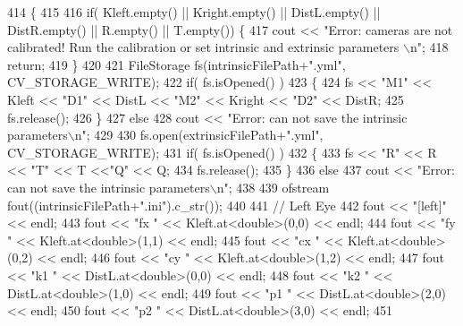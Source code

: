\begin{DoxyCode}
414                                                                                      \{
415 
416     \textcolor{keywordflow}{if}( Kleft.empty() || Kright.empty() || DistL.empty() || DistR.empty() || R.empty() || T.empty()) \{
417         cout << \textcolor{stringliteral}{"Error: cameras are not calibrated! Run the calibration or set intrinsic and extrinsic
       parameters \(\backslash\)n"};
418         \textcolor{keywordflow}{return};
419     \}
420 
421     FileStorage fs(intrinsicFilePath+\textcolor{stringliteral}{".yml"}, CV\_STORAGE\_WRITE);
422     \textcolor{keywordflow}{if}( fs.isOpened() )
423     \{
424         fs << \textcolor{stringliteral}{"M1"} << Kleft << \textcolor{stringliteral}{"D1"} << DistL << \textcolor{stringliteral}{"M2"} << Kright << \textcolor{stringliteral}{"D2"} << DistR;
425         fs.release();
426     \}
427     \textcolor{keywordflow}{else}
428         cout << \textcolor{stringliteral}{"Error: can not save the intrinsic parameters\(\backslash\)n"};
429 
430     fs.open(extrinsicFilePath+\textcolor{stringliteral}{".yml"}, CV\_STORAGE\_WRITE);
431     \textcolor{keywordflow}{if}( fs.isOpened() )
432     \{
433         fs << \textcolor{stringliteral}{"R"} << R << \textcolor{stringliteral}{"T"} << T <<\textcolor{stringliteral}{"Q"} << Q;
434         fs.release();
435     \}
436     \textcolor{keywordflow}{else}
437         cout << \textcolor{stringliteral}{"Error: can not save the intrinsic parameters\(\backslash\)n"};
438 
439     ofstream fout((intrinsicFilePath+\textcolor{stringliteral}{".ini"}).c\_str());
440 
441     \textcolor{comment}{// Left Eye}
442     fout << \textcolor{stringliteral}{"[left]"} << endl;
443     fout << \textcolor{stringliteral}{"fx "} << Kleft.at<\textcolor{keywordtype}{double}>(0,0) << endl;
444     fout << \textcolor{stringliteral}{"fy "} << Kleft.at<\textcolor{keywordtype}{double}>(1,1) << endl;
445     fout << \textcolor{stringliteral}{"cx "} << Kleft.at<\textcolor{keywordtype}{double}>(0,2) << endl;
446     fout << \textcolor{stringliteral}{"cy "} << Kleft.at<\textcolor{keywordtype}{double}>(1,2) << endl;
447     fout << \textcolor{stringliteral}{"k1 "} << DistL.at<\textcolor{keywordtype}{double}>(0,0) << endl;
448     fout << \textcolor{stringliteral}{"k2 "} << DistL.at<\textcolor{keywordtype}{double}>(1,0) << endl;
449     fout << \textcolor{stringliteral}{"p1 "} << DistL.at<\textcolor{keywordtype}{double}>(2,0) << endl;
450     fout << \textcolor{stringliteral}{"p2 "} << DistL.at<\textcolor{keywordtype}{double}>(3,0) << endl;
451 

\end{DoxyCode}
